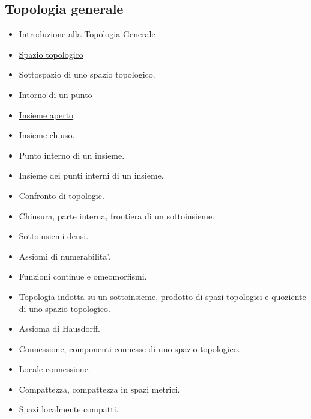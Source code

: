 \documentclass[a4paper,10pt]{article}
\begin{document}
  \subsection*{Topologia generale}
    \begin{itemize}
    \item \href{Topologia.html}{Introduzione alla Topologia Generale}
    \item \href{SpazioTopologico.html}{Spazio topologico}
    \item Sottospazio di uno spazio topologico.
    \item \href{IntornoPunto.html}{Intorno di un punto} 
    \item \href{InsiemeAperto.html}{Insieme aperto}
    \item Insieme chiuso.
    \item Punto interno di un insieme.
    \item Insieme dei punti interni di un insieme.
    \item Confronto di topologie. 
    \item Chiusura, parte interna, frontiera di un sottoinsieme. 
    \item Sottoinsiemi densi. 
    \item Assiomi di numerabilita'. 
    \item Funzioni continue e omeomorfismi. 
    \item Topologia indotta su un sottoinsieme, prodotto di spazi topologici e quoziente di uno spazio topologico.  
    \item Assioma di Hausdorff.  
    \item Connessione, componenti connesse di uno spazio topologico. 
    \item Locale connessione. 
    \item Compattezza, compattezza in spazi metrici. 
    \item Spazi localmente compatti. 
    \end{itemize}
\end{document}
